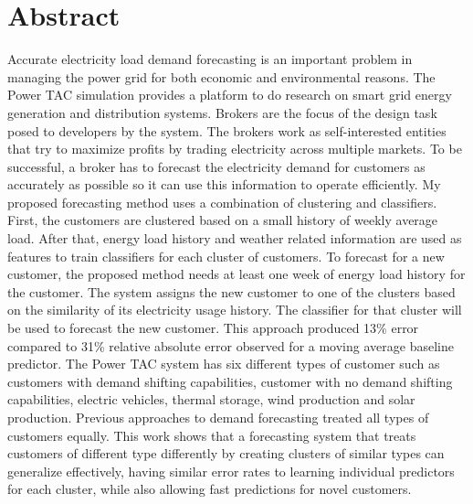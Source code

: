 

\chapter*{Abstract}

Accurate electricity load demand forecasting is an important problem in managing the power grid for both economic and environmental reasons. The Power TAC simulation provides a platform to do research on smart grid energy generation and distribution systems. Brokers are the focus of the design task posed to developers by the system. The brokers work as self-interested entities that try to maximize profits by trading electricity across multiple markets. To be successful, a broker has to forecast  the electricity demand for customers as accurately as possible so it can use this information to operate efficiently. My proposed forecasting method uses a combination of clustering and classifiers. First, the customers are clustered based on a small history of weekly average load. After that, energy load history and weather related information are used as features to train classifiers for each cluster of customers. To forecast for a new customer, the proposed method needs at least one week of energy load history for the customer. The system assigns the  new customer to one of the clusters based on the similarity of its electricity usage history. The classifier for that cluster will be used to forecast the new customer. This approach produced 13\% error compared to 31\% relative absolute error observed for a moving average baseline predictor. The Power TAC system has six different types of customer such as customers with demand shifting capabilities, customer with no demand shifting capabilities, electric vehicles, thermal storage, wind production and solar production. Previous approaches to demand forecasting treated all types of customers equally. This work shows that a forecasting system that treats customers of different type differently by creating clusters of similar types can generalize effectively, having similar error rates to learning individual predictors for each cluster, while also allowing fast predictions for novel customers.
